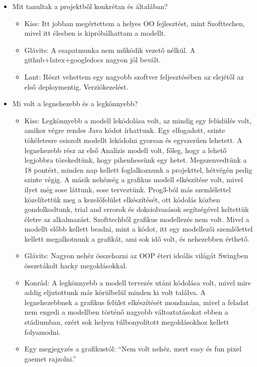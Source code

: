 \begin{itemize}
\item Mit tanultak a projektből konkrétan és általában? \newline
\begin{itemize}
	\item Kiss: Itt jobban megértettem a helyes OO fejlesztést, mint Szofttechen, mivel itt élesben is kipróbálhattam a modellt.
	\item Glávits: A csapatmunka nem működik vezető nélkül. A github+latex+googledocs nagyon jól bevált.
	\item Lant: Részt vehettem egy nagyobb szoftver feljesztésében az elejétől az első deploymentig. Verziókezelést.
\end{itemize}
\item Mi volt a legnehezebb és a legkönnyebb? \newline
\begin{itemize}
	\item Kiss: Legkönnyebb a modell lekódolása volt, az mindig egy felüdülés volt, amikor végre rendes Java kódot írhattunk. Egy elfogadott, szinte tökéletesre csiszolt modellt lekódolni gyorsan és egyszerűen lehetett. A legnehezebb rész az első Analízis modell volt, főleg, hogy a lehető legjobbra törekedtünk, hogy pihenhessünk egy hetet. Megszenvedtünk a 18 pontért, minden nap kellett foglalkoznunk a projekttel, hétvégén pedig szinte végig. A másik nehézség a grafikus modell elkészítése volt, mivel ilyet még sose láttunk, sose terveztünk. Prog3-ból más szemlélettel közelítettük meg a kezelőfelület elkészítését, ott kódolás közben gondolkodtunk, trial and errorok és doksiolvasások segítségével keltettük életre az alkalmazást. Szofttechből grafikus modellezés nem volt. Mivel a modellt előbb kellett beadni, mint a kódot, itt egy modellezői szemlélettel kellett megalkotnunk a grafikát, ami sok idő volt, és nehezebben érthető.
	\item Glávits: Nagyon nehéz összehozni az OOP éteri ideális világát Swingben összetákolt hacky megoldásokkal.
	\item Konrád: A legkönnyebb a modell tervezés utáni kódolása volt, mivel mire addig eljutottunk már körülbelül minden ki volt találva. A legnehezebbnek a grafikus felület elkészítését mondanám, mivel a feladat nem engedi a modellben történő nagyobb változtatásokat ebben a stádiumban, ezért sok helyen túlbonyolított megoldásokhoz kellett folyamodni. 
	\item Egy megjegyzés a grafikustól: ``Nem volt nehéz, mert easy és fun pixel gaemet rajzolni.''

\end{itemize}
\end{itemize}

